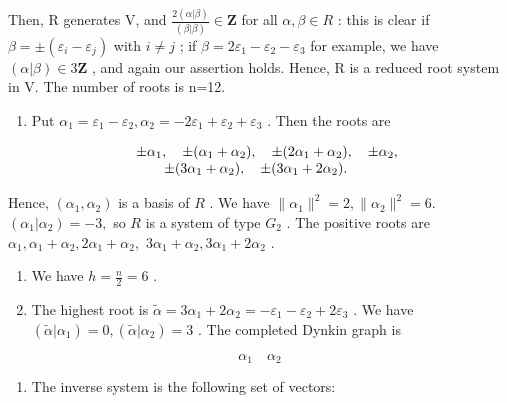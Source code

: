 Then, R generates V, and \(\frac{2(\alpha|\beta)}{(\beta|\beta)}\in\mathbf{Z}\) for all \(\alpha,\beta\in R\) : this is clear if \(\beta=\pm(\varepsilon_{i}-\varepsilon_{j})\) with \(i\neq j\) ; if \(\beta=2\varepsilon_{1}-\varepsilon_{2}-\varepsilon_{3}\) for example, we have \((\alpha|\beta)\in3\mathbf{Z}\) , and again our assertion holds. Hence, R is a reduced root system in V. The number of roots is n=12.

\begin{enumerate}
\def\labelenumi{(\Roman{enumi})}
\setcounter{enumi}{1}
\tightlist
\item
  Put \(\alpha_{1} = \varepsilon_{1} - \varepsilon_{2},\alpha_{2} = -2\varepsilon_{1} + \varepsilon_{2} + \varepsilon_{3}\) . Then the roots are
\end{enumerate}

\[
\begin{array}{r l} & {\pm \alpha_ {1}, \quad \pm (\alpha_ {1} + \alpha_ {2}), \quad \pm (2 \alpha_ {1} + \alpha_ {2}), \quad \pm \alpha_ {2},} \\ & {\qquad \pm (3 \alpha_ {1} + \alpha_ {2}), \quad \pm (3 \alpha_ {1} + 2 \alpha_ {2}).} \end{array}
\]

Hence, \((\alpha_{1},\alpha_{2})\) is a basis of \(R\) . We have \(\| \alpha_{1}\|^{2} = 2,\| \alpha_{2}\|^{2} = 6.\) \((\alpha_{1}|\alpha_{2}) = -3,\) so \(R\) is a system of type \(G_{2}\) . The positive roots are \(\alpha_{1},\alpha_{1} + \alpha_{2},2\alpha_{1} + \alpha_{2},\) \(3\alpha_{1} + \alpha_{2},3\alpha_{1} + 2\alpha_{2}\) .

\begin{enumerate}
\def\labelenumi{(\Roman{enumi})}
\setcounter{enumi}{2}
\item
  We have \(h = \frac{n}{2} = 6\) .
\item
  The highest root is \(\tilde{\alpha} = 3\alpha_{1} + 2\alpha_{2} = -\varepsilon_{1} - \varepsilon_{2} + 2\varepsilon_{3}\) . We have \((\tilde{\alpha}|\alpha_{1}) = 0, (\tilde{\alpha}|\alpha_{2}) = 3\) . The completed Dynkin graph is
\end{enumerate}

\[
\alpha_ {1} \quad \alpha_ {2}
\]

\begin{enumerate}
\def\labelenumi{(\Alph{enumi})}
\setcounter{enumi}{21}
\tightlist
\item
  The inverse system is the following set of vectors:
\end{enumerate}

